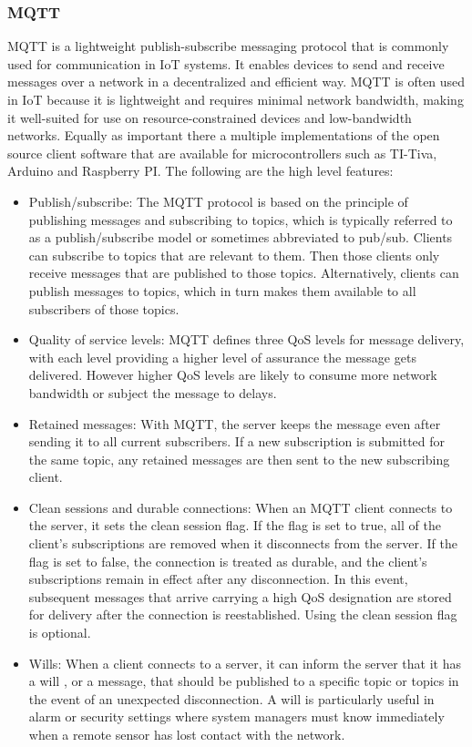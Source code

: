 \subsubsection{MQTT}
\ac{MQTT} is a lightweight publish-subscribe messaging protocol that is commonly used for communication in \ac{IoT} systems. It enables devices to send and receive messages over a network in a decentralized and efficient way. \ac{MQTT} is often used in \ac{IoT} because it is lightweight and requires minimal network bandwidth, making it well-suited for use on resource-constrained devices and low-bandwidth networks. Equally as important there a multiple implementations of the open source client software that are available for microcontrollers such as TI-Tiva, Arduino and Raspberry PI. The following are the high level features:
\begin{itemize}
\item Publish/subscribe: The \ac{MQTT} protocol is based on the principle of publishing messages and subscribing to topics, which is typically referred to as a publish/subscribe model or sometimes abbreviated to pub/sub. Clients can subscribe to topics that are relevant to them. Then those clients only receive messages that are published to those topics. Alternatively, clients can publish messages to topics, which in turn makes them available to all subscribers of those topics.
\item Quality of service levels: \ac{MQTT} defines three \ac{QoS} levels for message delivery, with each level providing a higher level of assurance the message gets delivered. However higher \ac{QoS} levels are likely to consume more network bandwidth or subject the message to delays.
\item Retained messages: With \ac{MQTT}, the server keeps the message even after sending it to all current subscribers. If a new subscription is submitted for the same topic, any retained messages are then sent to the new subscribing client.
\item Clean sessions and durable connections: When an \ac{MQTT} client connects to the server, it sets the clean session flag. If the flag is set to true, all of the client’s subscriptions are removed when it disconnects from the server. If the flag is set to false, the connection is treated as durable, and the client’s subscriptions remain in effect after any disconnection. In this event, subsequent messages that arrive carrying a high \ac{QoS} designation are stored for delivery after the connection is reestablished. Using the clean session flag is optional.
\item Wills: When a client connects to a server, it can inform the server that it has a will , or a message, that should be published to a specific topic or topics in the event of an unexpected disconnection. A will is particularly useful in alarm or security settings where system managers must know immediately when a remote sensor has lost contact with the network.
\end{itemize}
